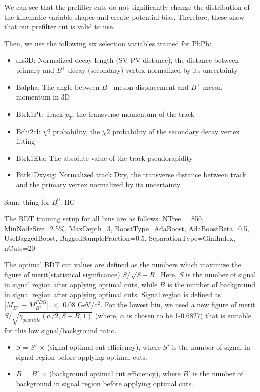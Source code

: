 We can see that the prefilter cuts do not significantly change the distribution of the kinematic variable shapes and create potential bias. Therefore, these show that our prefilter cut is valid to use. 

Then, we use the following six selection variables trained for PbPb:
\begin{itemize}
\item dls3D: Normalized decay length (SV PV distance), the distance between primary and $B^{+}$ decay (secondary) vertex normalized by its uncertainty
\item Balpha: The angle between $B^{+}$ meson displacement and $B^{+}$ meson momentum in 3D
\item Btrk1Pt: Track $p_{T}$, the transverse momentum of the track
\item Bchi2cl: $\chi2$ probability, the $\chi2$ probability of the secondary decay vertex fitting
\item Btrk1Eta: The absolute value of the track pseudorapidity
\item Btrk1Dxysig: Normalized track Dxy, the transverse distance between track and the primary vertex normalized by its uncertainty
\end{itemize}

Same thing for $B^0_s$. HG

The BDT training setup for all \pt bins are as follows: NTree = 850, MinNodeSize=2.5\%, MaxDepth=3, BoostType=AdaBoost, AdaBoostBeta=0.5, UseBaggedBoost, BaggedSampleFraction=0.5, SeparationType=GiniIndex, nCuts=20

The optimal BDT cut values are defined as the numbers which maximize the figure of merit(statistical significance) $S/\sqrt{S+B}$. Here, $S$ is the number of signal in signal region after applying optimal cuts, while $B$ is the number of background in signal region after applying optimal cuts. Signal region is defined as $|M_{B^{+}}-M_{B^{+}}^{PDG}|$ $<$ 0.08 GeV/c$^2$. For the lowest \pt bin, we used a new figure of merit $S/\sqrt{\gamma_{quantile}(\alpha/2,S+B,1)}$ (where, $\alpha$ is chosen to be 1-0.6827) that is suitable for this low signal/background ratio. 

\begin{itemize}
\item $S$ = $S'$ $\times$ (signal optimal cut efficiency), where $S'$ is the number of signal in signal region before applying optimal cuts.
\item $B$ = $B'$ $\times$ (background optimal cut efficiency), where $B'$ is the number of background in signal region before applying optimal cuts.
\end{itemize}

